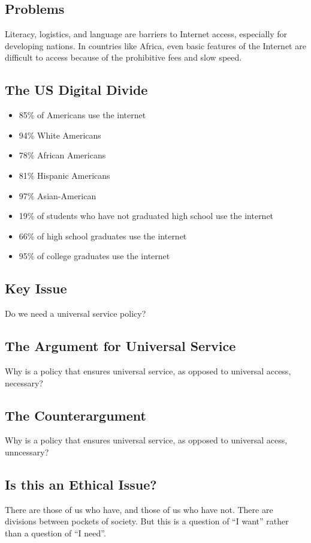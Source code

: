 \documentclass{article}
\begin{document}
\subsection*{Problems}
Literacy, logistics, and language are barriers to Internet access, especially
for developing nations. In countries like Africa, even basic features of the
Internet are difficult to access because of the prohibitive fees and slow
speed.

\subsection*{The US Digital Divide}
\begin{itemize}
  \item 85\% of Americans use the internet
  \item 94\% White Americans
  \item 78\% African Americans
  \item 81\% Hispanic Americans
  \item 97\% Asian-American
  \item 19\% of students who have not graduated high school use the internet
  \item 66\% of high school graduates use the internet
  \item 95\% of college graduates use the internet
\end{itemize}

\subsection*{Key Issue}
Do we need a universal service policy?

\subsection*{The Argument for Universal Service}
Why is a policy that ensures universal service, as opposed to universal access,
necessary?

\subsection*{The Counterargument}
Why is a policy that ensures universal service, as opposed to universal acess,
unncessary?

\subsection*{Is this an Ethical Issue?}
There are those of us who have, and those of us who have not. There are
divisions between pockets of society. But this is a question of ``I want''
rather than a question of ``I need''.
\end{document}
